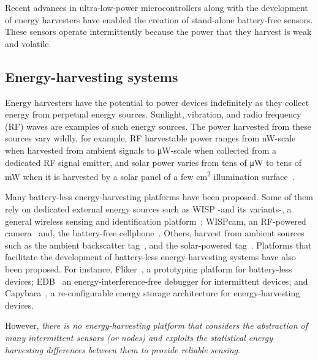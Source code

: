 Recent advances in ultra-low-power microcontrollers along with the development of energy harvesters have enabled the creation of stand-alone battery-free sensors. These sensors operate intermittently because the power that they harvest is
weak and volatile.

\subsection{Energy-harvesting systems}
Energy harvesters have the potential to power devices indefinitely as they collect energy from perpetual energy sources. Sunlight, vibration, and radio frequency (RF) waves are examples of such energy sources. The power harvested from these sources vary wildly, for example, RF harvestable power ranges from
\si{\nano\watt}-scale when harvested from ambient signals to \si{\uW}-scale when collected from a dedicated RF signal emitter, and solar power varies from tens of \si{\uW} to tens of \si{\mW} when it is harvested by a solar panel of a few \si{\cm^2} illumination surface~\cite{lucia2017intermittent,rao2017ambient}.

Many battery-less energy-harvesting platforms have been proposed. Some of them rely on dedicated external energy sources such as WISP -and its variants-, a general wireless sensing and identification platform~\cite{smith2006wirelessly,zhao2015nfc,zhang2011moo}; WISPcam,  an RF-powered camera~\cite{naderiparizi2015wispcam} and, the battery-free cellphone~\cite{talla2017battery}. Others, harvest from ambient sources such as the ambient backscatter tag~\cite{liu2013ambient}, and the solar-powered tag~\cite{majid2019multi}. Platforms that facilitate the development of battery-less energy-harvesting systems have also been proposed. For instance, Fliker~\cite{hester2017flicker}, a prototyping platform for battery-less devices; EDB~\cite{colin2016energy} an energy-interference-free debugger for intermittent devices;  and Capybara~\cite{colin2018reconfigurable}, a re-configurable energy storage architecture for energy-harvesting devices.

However, \emph{there is no energy-harvesting platform that considers the abstraction of many intermittent sensors (or nodes) and exploits the statistical energy harvesting differences between them to provide reliable sensing}.


